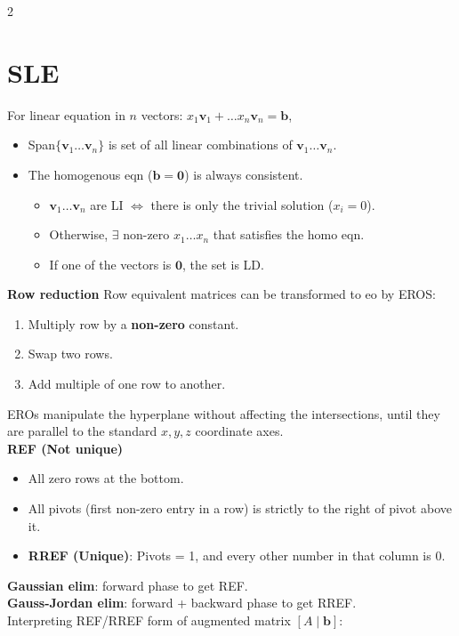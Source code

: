 \documentclass[10pt]{article}
\begin{document}
\begin{multicols*}{2}
\section*{SLE}
For linear equation in $n$ vectors: $x_1\textbf{v}_1 + \ldots x_n\mathbf{v}_n = \mathbf{b}$,
\begin{itemize}
    \item Span$\{\mathbf{v}_1\ldots\mathbf{v}_n\}$ is set of all linear combinations of $\mathbf{v}_1\ldots\mathbf{v}_n$.
    \item The homogenous eqn ($\mathbf{b}=\mathbf{0}$) is always consistent.
    \begin{itemize}
        \item $\mathbf{v}_1 \ldots \mathbf{v}_n$ are LI $\Leftrightarrow$ there is only the trivial solution ($x_i=0$).
        \item Otherwise, $\exists$ non-zero $x_1\ldots x_n$ that satisfies the homo eqn.
        \item If one of the vectors is $\mathbf{0}$, the set is LD.
    \end{itemize}
\end{itemize}
\textbf{Row reduction} Row equivalent matrices can be transformed to eo by EROS:
\begin{enumerate}
    \item Multiply row by a \textbf{non-zero} constant.
    \item Swap two rows.
    \item Add multiple of one row to another.
\end{enumerate}
EROs manipulate the hyperplane without affecting the intersections, until they are parallel to the standard $x, y, z$ coordinate axes.\\
\textbf{REF (Not unique)}
\begin{itemize}
    \item All zero rows at the bottom.
    \item All pivots (first non-zero entry in a row) is strictly to the right of pivot above it.
    \item \textbf{RREF (Unique)}: Pivots = 1, and every other number in that column is 0.
\end{itemize}
\textbf{Gaussian elim}: forward phase to get REF.\\
\textbf{Gauss-Jordan elim}: forward + backward phase to get RREF.\\
Interpreting REF/RREF form of augmented matrix $[A \mid \mathbf{b}]$:

\end{multicols*}
\end{document}
